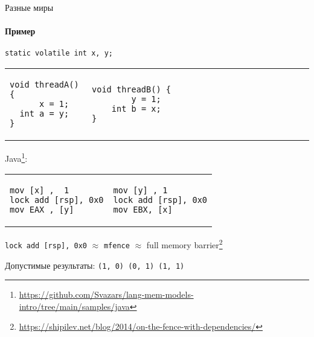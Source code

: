 \begin{frame}{Разные миры}
\framesubtitle{Пример}

\begin{verbatim}
static volatile int x, y; 
\end{verbatim}

\begin{tabular}{p{} p{}}

\begin{verbatim}
void threadA() {
      x = 1;
  int a = y;
}
\end{verbatim}

& 

\begin{verbatim}
void threadB() {                                   
        y = 1;                           
    int b = x;                           
}                    
\end{verbatim}
\end{tabular}

\vspace{-0.5cm}
Java\footnote{\tiny\url{https://github.com/Svazars/lang-mem-models-intro/tree/main/samples/java}}:


\begin{tabular}{p{} p{}}
\begin{verbatim}
mov [x] ,  1
lock add [rsp], 0x0
mov EAX , [y]
\end{verbatim}

& 

\begin{verbatim}
mov [y] , 1
lock add [rsp], 0x0
mov EBX, [x]
\end{verbatim}
\end{tabular}

\pause
\vspace{-0.5cm}
\texttt{lock add [rsp], 0x0} $\approx$ \texttt{mfence} $\approx$ full memory barrier\footnote<2->{\tiny\url{https://shipilev.net/blog/2014/on-the-fence-with-dependencies/}}

\pause
Допустимые результаты: \texttt{(1, 0) (0, 1) (1, 1)}

\end{frame}


